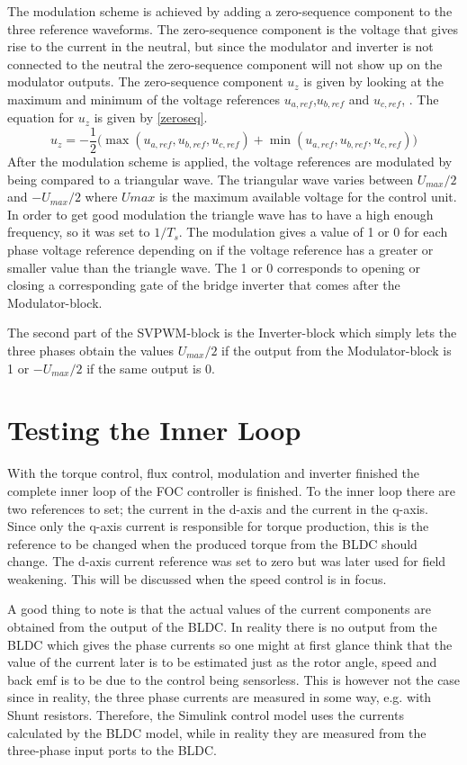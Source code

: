 \documentclass{LTHthesis}
\begin{document}
The modulation scheme is achieved by adding a zero-sequence component to the three reference waveforms. The zero-sequence component is the voltage that gives rise to the current in the neutral, but since the modulator and inverter is not connected to the neutral the zero-sequence component will not show up on the modulator outputs. The zero-sequence component $u_z$ is given by looking at the maximum and minimum of the voltage references $u_{a,ref}$,$u_{b,ref}$ and $u_{c,ref}$, \cite{ala_kar2014}. The equation for $u_z$ is given by \eqref{zeroseq}.
\begin{equation} \label{zeroseq}
u_z=-\frac{1}{2}\big(\max(u_{a,ref},u_{b,ref},u_{c,ref})+\min(u_{a,ref},u_{b,ref},u_{c,ref})\big)
\end{equation}
After the modulation scheme is applied, the voltage references are modulated by being compared to a triangular wave. The triangular wave varies between $U_{max}/2$ and $-U_{max}/2$ where $Umax$ is the maximum available voltage for the control unit. In order to get good modulation the triangle wave has to have a high enough frequency, so it was set to $1/T_s$. The modulation gives a value of 1 or 0 for each phase voltage reference depending on if the voltage reference has a greater or smaller value than the triangle wave. The 1 or 0 corresponds to opening or closing a corresponding gate of the bridge inverter that comes after the Modulator-block.

The second part of the SVPWM-block is the Inverter-block which simply lets the three phases obtain the values $U_{max}/2$ if the output from the Modulator-block is 1 or $-U_{max}/2$ if the same output is 0.

\section{Testing the Inner Loop}
With the torque control, flux control, modulation and inverter finished the complete inner loop of the FOC controller is finished. To the inner loop there are two references to set; the current in the d-axis and the current in the q-axis. Since only the q-axis current is responsible for torque production, this is the reference to be changed when the produced torque from the BLDC should change. The d-axis current reference was set to zero but was later used for field weakening. This will be discussed when the speed control is in focus.

A good thing to note is that the actual values of the current components are obtained from the output of the BLDC. In reality there is no output from the BLDC which gives the phase currents so one might at first glance think that the value of the current later is to be estimated just as the rotor angle, speed and back emf is to be due to the control being sensorless. This is however not the case since in reality, the three phase currents are measured in some way, e.g. with Shunt resistors. Therefore, the Simulink control model uses the currents calculated by the BLDC model, while in reality they are measured from the three-phase input ports to the BLDC.
\end{document}
